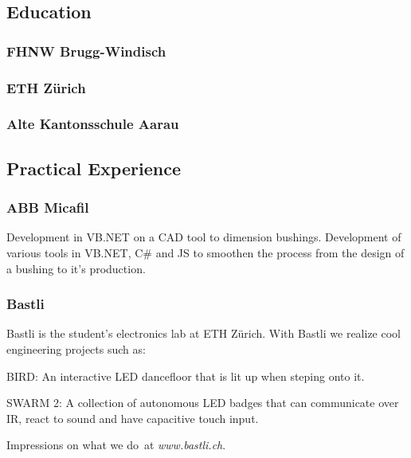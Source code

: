 \documentclass[]{resume}
\begin{document}
\begin{timeline}


\subsection{Education}

\subsubsection{FHNW Brugg-Windisch}
\sectionsep

\subsubsection{ETH Zürich}
\sectionsep

\subsubsection{Alte Kantonsschule Aarau}
\sectionsep


\subsection{Practical Experience}

\subsubsection{ABB Micafil}
Development in VB.NET on a CAD tool to dimension bushings.
Development of various tools in VB.NET, C\# and JS to smoothen the process from the design of a bushing to it's production.
\sectionsep

\subsubsection{Bastli}
Bastli is the student's electronics lab at ETH Zürich.
With Bastli we realize cool engineering projects such as:
\vspace{\topsep} %
\begin{tightemize}
\item BIRD: An interactive LED dancefloor that is lit up when steping onto it. 
\item SWARM 2: A collection of autonomous LED badges that can communicate over IR, react to sound and have capacitive touch input.
\end{tightemize}
Impressions on what we do at \textit{www.bastli.ch}.
\sectionsep


\end{timeline}
\end{document}

